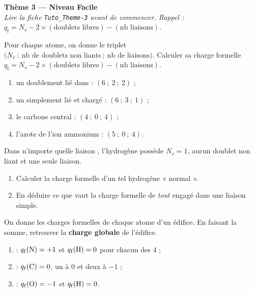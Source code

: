 \documentclass[11pt,a4paper]{article}
\begin{document}
\begin{center}
{\Large\bfseries\color{primarydark}Thème 3 — Niveau Facile}\\[2pt]
{\small\itshape Lire la fiche \texttt{Tuto\_Theme-3} avant de commencer. Rappel :
$q_{\mathrm{f}} = N_v - 2\times(\text{doublets libres}) - (\text{nb liaisons})$.}
\end{center}
\medskip

\begin{exo}
Pour chaque atome, on donne le triplet $\big(N_v\ ;\ \text{nb de doublets non liants}\ ;\
\text{nb de liaisons}\big)$. Calculer sa charge formelle
$q_{\mathrm{f}} = N_v - 2\times(\text{doublets libres}) - (\text{nb liaisons})$.
\begin{enumerate}[label=\alph*),leftmargin=2em,itemsep=1pt]
  \item un  doublement lié dans  : $(6\ ;\ 2\ ;\ 2)$ ;
  \item un \ce{O} simplement lié et chargé : $(6\ ;\ 3\ ;\ 1)$ ;
  \item le carbone central : $(4\ ;\ 0\ ;\ 4)$ ;
  \item l'azote de l'ion ammonium  : $(5\ ;\ 0\ ;\ 4)$.
\end{enumerate}
\end{exo}

\begin{exo}
Dans n'importe quelle liaison , l'hydrogène possède $N_v = 1$, aucun doublet non liant et
une seule liaison.
\begin{enumerate}[label=\alph*),leftmargin=2em,itemsep=1pt]
  \item Calculer la charge formelle d'un tel hydrogène « normal ».
  \item En déduire ce que vaut la charge formelle de \emph{tout}  engagé dans une liaison simple.
\end{enumerate}
\end{exo}

\begin{exo}
On donne les charges formelles de chaque atome d'un édifice. En faisant la somme, retrouver la
\textbf{charge globale} de l'édifice.
\begin{enumerate}[label=\alph*),leftmargin=2em,itemsep=1pt]
  \item {} : $q_{\mathrm{f}}(\ce{N}) = +1$ et $q_{\mathrm{f}}() = 0$ pour chacun des 4 \ce{H} ;
  \item \ce{CO3^2-} : $q_{\mathrm{f}}(\ce{C}) = 0$, un \ce{O} à $0$ et deux \ce{O} à $-1$ ;
  \item \ce{OH^-} : $q_{\mathrm{f}}(\ce{O}) = -1$ et $q_{\mathrm{f}}(\ce{H}) = 0$.
\end{enumerate}
\end{exo}
\end{document}
